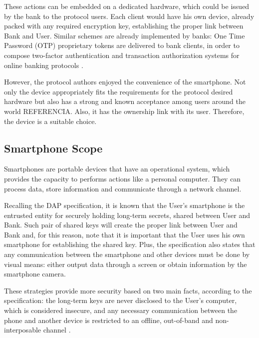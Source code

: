 
These actions can be embedded on a dedicated hardware, which could be issued by the bank to the protocol users. Each client would have his own device, already packed with any required encryption key, establishing the proper link between Bank and User. Similar schemes are already implemented by banks: One Time Password (OTP) proprietary tokens are delivered to bank clients, in order to compose two-factor authentication and transaction authorization systems for online banking protocols \cite{web-passwords, bank-passwords}.

However, the protocol authors enjoyed the convenience of the smartphone. Not only the device appropriately fits the requirements for the protocol desired hardware but also has a strong and known acceptance among users around the world {\color{blue} REFERENCIA}. Also, it has the ownership link with its user. Therefore, the device is a suitable choice.



\subsection{Smartphone Scope}
\label{sec:smartphone-first-analysis}
Smartphones are portable devices that have an operational system, which provides the capacity to performs actions like a personal computer. They can process data, store information and communicate through a network channel.

Recalling the DAP specification, it is known that the User's smartphone is the entrusted entity for securely holding long-term secrets, shared between User and Bank. Such pair of shared keys will create the proper link between User and Bank and, for this reason, note that it is important that the User uses his own smartphone for establishing the shared key. Plus, the specification also states that any communication between the smartphone and other devices must be done by visual means: either output data through a screen or obtain information by the smartphone camera.

These strategies provide more security based on two main facts, according to the specification: the long-term keys are never disclosed to the User's computer, which is considered insecure, and any necessary communication between the phone and another device is restricted to an offline, out-of-band and non-interposable channel \cite{bbcode-thesis}.

